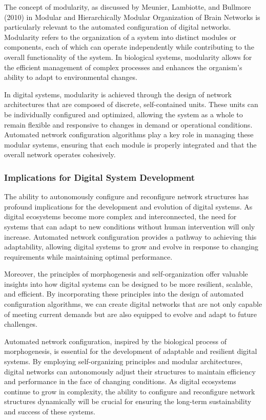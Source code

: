 \documentclass[12pt,twoside]{article}
\begin{document}
The concept of modularity, as discussed by Meunier, Lambiotte, and Bullmore (2010) in Modular and Hierarchically Modular Organization of Brain Networks is particularly relevant to the automated configuration of digital networks. Modularity refers to the organization of a system into distinct modules or components, each of which can operate independently while contributing to the overall functionality of the system. In biological systems, modularity allows for the efficient management of complex processes and enhances the organism’s ability to adapt to environmental changes.

In digital systems, modularity is achieved through the design of network architectures that are composed of discrete, self-contained units. These units can be individually configured and optimized, allowing the system as a whole to remain flexible and responsive to changes in demand or operational conditions. Automated network configuration algorithms play a key role in managing these modular systems, ensuring that each module is properly integrated and that the overall network operates cohesively.

\subsubsection{Implications for Digital System Development}

The ability to autonomously configure and reconfigure network structures has profound implications for the development and evolution of digital systems. As digital ecosystems become more complex and interconnected, the need for systems that can adapt to new conditions without human intervention will only increase. Automated network configuration provides a pathway to achieving this adaptability, allowing digital systems to grow and evolve in response to changing requirements while maintaining optimal performance.

Moreover, the principles of morphogenesis and self-organization offer valuable insights into how digital systems can be designed to be more resilient, scalable, and efficient. By incorporating these principles into the design of automated configuration algorithms, we can create digital networks that are not only capable of meeting current demands but are also equipped to evolve and adapt to future challenges.

Automated network configuration, inspired by the biological process of morphogenesis, is essential for the development of adaptable and resilient digital systems. By employing self-organizing principles and modular architectures, digital networks can autonomously adjust their structures to maintain efficiency and performance in the face of changing conditions. As digital ecosystems continue to grow in complexity, the ability to configure and reconfigure network structures dynamically will be crucial for ensuring the long-term sustainability and success of these systems.
\end{document}
